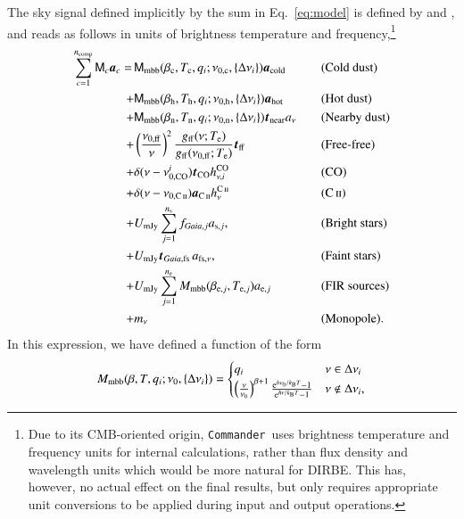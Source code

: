 \documentclass{aa}
\def\commander{\texttt{Commander}}
\def\GAIA{\textit{Gaia}}
\def\gaia{\textit{Gaia}}
\newcommand{\CII}{\ensuremath{\textsc{C\,ii}}}
\renewcommand{\t}[0]{\vec{t}}
\renewcommand{\a}[0]{\vec{a}}
\newcommand{\M}[0]{\tens{M}}
\newcommand{\Te}[0]{T_{\rm e}}
\newcommand{\e}{\mathrm e}
\def\Tcold{\ifmmode T_\mathrm{c}\else $T_{\mathrm{c}}$\fi}
\def\Thot{\ifmmode T_\mathrm{h}\else $T_{\mathrm{h}}$\fi}
\def\Tnear{\ifmmode T_\mathrm{n}\else $T_{\mathrm{n}}$\fi}
\def\bcold{\ifmmode \beta_\mathrm{c}\else $\beta_{\mathrm{c}}$\fi}
\def\bhot{\ifmmode \beta_\mathrm{h}\else $\beta_{\mathrm{h}}$\fi}
\def\bnear{\ifmmode \beta_\mathrm{n}\else $\beta_{\mathrm{n}}$\fi}
\def\nuzeroff{\ifmmode \nu_{0,\mathrm{ff}}\else $\nu_{0,\mathrm{ff}}$\fi}
\def\nuzerocold{\ifmmode \nu_{0,\mathrm{c}}\else $\nu_{0,\mathrm{c}}$\fi}
\def\nuzerohot{\ifmmode \nu_{0,\mathrm{h}}\else $\nu_{0,\mathrm{h}}$\fi}
\def\nuzeronear{\ifmmode \nu_{0,\mathrm{n}}\else $\nu_{0,\mathrm{n}}$\fi}
\def\Te{\ifmmode T_{\mathrm{e}}\else $T_{\mathrm{e}}$\fi}
\def\kB{\ifmmode k_\mathrm{B}\else $k_{\mathrm{B}}$\fi}
\begin{document}
The sky signal defined implicitly by the sum in Eq.~\eqref{eq:model}
is defined by \citet{CG02_04} and \citet{CG02_05}, and reads as follows in units
of brightness temperature and frequency,\footnote{Due to its
CMB-oriented origin, \commander\ uses brightness temperature and
frequency units for internal calculations, rather than flux density
and wavelength units which would be more natural for DIRBE. This has,
however, no actual effect on the final results, but only requires
appropriate unit conversions to be applied during input and output
operations. }
\begin{alignat}{4}
  \sum_{c=1}^{n_{\mathrm{comp}}} \M_c \a_c  = \,
  &\M_{\mathrm{mbb}}(\bcold,\Tcold, q_i;\nuzerocold,\{\Delta\nu_i\})\vec{a}_{\mathrm{cold}}
  && \textrm{(Cold dust)}\nonumber\\ %
  + &\M_{\mathrm{mbb}}(\bhot,\Thot, q_i;\nuzerohot,\{\Delta\nu_i\})
  \vec{a}_{\mathrm{hot}} && \textrm{(Hot dust)}\nonumber \\
  + &\M_{\mathrm{mbb}}(\bnear,\Tnear,q_i;\nuzeronear,\{\Delta\nu_i\}) \t_{\mathrm{near}}
  a_{\nu} && \textrm{(Nearby dust)} \nonumber \\
  + &\left(\frac{\nuzeroff}{\nu}\right)^2
  \frac{g_{\mathrm{ff}}(\nu;\Te) }{g_{\mathrm{ff}}(\nuzeroff;\Te)}
  \vec{t}_{\mathrm{ff}} && \textrm{(Free-free)} \nonumber\\
  + &\delta(\nu-\nu_{0,\mathrm{CO}}^i) \t_{\mathrm{CO}}
  h^{\mathrm{CO}}_{\nu,i} && \textrm{(CO)}\nonumber\\
	+ &\delta(\nu-\nu_{0,\CII}) \a_{\CII}
  h^{\CII}_{\nu} && (\CII) \nonumber\\
  + &U_{\mathrm{mJy}} \sum_{j=1}^{n_{\mathrm{s}}}
  f_{\GAIA,j} a_{\mathrm{s},j}, &\quad&
  \textrm{(Bright stars)} \nonumber\\
  + &U_{\mathrm{mJy}} \t_{\gaia,\mathrm{fs}}\, a_{\mathrm{fs},\nu}, &\quad&
  \textrm{(Faint stars)} \nonumber\\  
    + &U_{\mathrm{mJy}} \sum_{j=1}^{n_{\mathrm{e}}}
  M_{\mathrm{mbb}}(\beta_{\mathrm{e},j},
  T_{\mathrm{e},j})
  a_{\mathrm{e},j} && \textrm{(FIR sources)}\nonumber\\
  + &m_{\nu} && \textrm{(Monopole)}. \nonumber
\end{alignat}
In this expression, we have defined a function of the form
\begin{equation}
  M_{\mathrm{mbb}}(\beta, T, q_i;\nu_0, \{\Delta\nu_i\}) =
    \begin{cases}
      q_i & \nu \in \Delta\nu_i\\
      \left(\frac{\nu}{\nu_0}\right)^{\beta+1}
  \frac{\e^{h\nu_0/\kB T}-1}{\e^{h\nu/\kB T}-1} & \nu \notin \Delta\nu_i,
    \end{cases}       
\end{equation}
\end{document}
